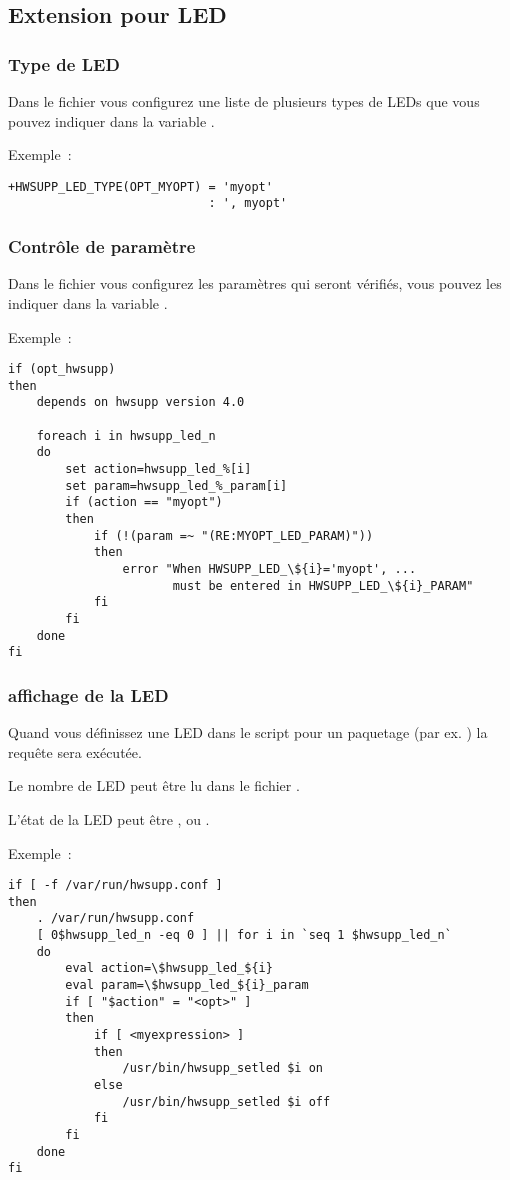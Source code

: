 \subsection{Extension pour LED}
\subsubsection{Type de LED}
  Dans le fichier  vous configurez une liste de plusieurs types
  de LEDs que vous pouvez indiquer dans la variable .

Exemple~:
\begin{verbatim}
+HWSUPP_LED_TYPE(OPT_MYOPT) = 'myopt' 
                            : ', myopt'
\end{verbatim}

\subsubsection{Contrôle de paramètre}
  Dans le fichier  vous configurez les paramètres qui seront vérifiés,
  vous pouvez les indiquer dans la variable .

Exemple~:
\begin{verbatim}
if (opt_hwsupp)
then
    depends on hwsupp version 4.0

    foreach i in hwsupp_led_n
    do
        set action=hwsupp_led_%[i]
        set param=hwsupp_led_%_param[i]
        if (action == "myopt")
        then
            if (!(param =~ "(RE:MYOPT_LED_PARAM)"))
            then
                error "When HWSUPP_LED_\${i}='myopt', ...
                       must be entered in HWSUPP_LED_\${i}_PARAM" 
            fi
        fi
    done
fi
\end{verbatim}

\subsubsection {affichage de la LED}
  Quand vous définissez une LED dans le script pour un paquetage (par ex. )
  la requête  sera exécutée.

  Le nombre de LED peut être lu dans le fichier .

  L'état de la LED peut être ,  ou .

Exemple~:
\begin{verbatim}
if [ -f /var/run/hwsupp.conf ]
then
    . /var/run/hwsupp.conf
    [ 0$hwsupp_led_n -eq 0 ] || for i in `seq 1 $hwsupp_led_n`
    do
        eval action=\$hwsupp_led_${i}
        eval param=\$hwsupp_led_${i}_param
        if [ "$action" = "<opt>" ]
        then
            if [ <myexpression> ]
            then
                /usr/bin/hwsupp_setled $i on
            else
                /usr/bin/hwsupp_setled $i off
            fi
        fi
    done
fi
\end{verbatim}

